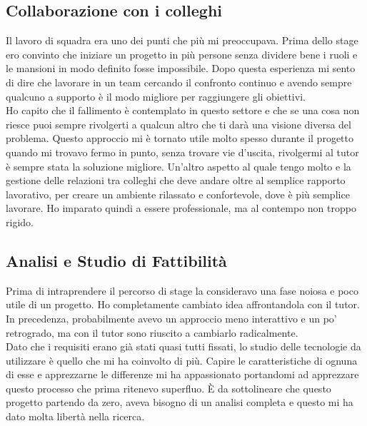 \subsection{Collaborazione con i colleghi}
Il lavoro di squadra era uno dei punti che più mi preoccupava. Prima dello stage ero convinto che iniziare un progetto in più persone senza
dividere bene i ruoli e le mansioni in modo definito fosse impossibile. Dopo questa esperienza mi sento di dire che lavorare in un team
cercando il confronto continuo e avendo sempre qualcuno a supporto è il modo migliore per raggiungere gli obiettivi. \\ 
\noindent Ho capito che il fallimento è contemplato in questo settore e che se una cosa non riesce puoi sempre rivolgerti a qualcun altro
che ti darà una visione diversa del problema. Questo approccio mi è tornato utile molto spesso durante il progetto quando mi trovavo fermo
in punto, senza trovare vie d'uscita, rivolgermi al tutor è sempre stata la soluzione migliore.
\noindent Un'altro aspetto al quale tengo molto e la gestione delle relazioni tra colleghi che deve andare oltre al semplice rapporto
lavorativo, per creare un ambiente rilassato e confortevole, dove è più semplice lavorare. Ho imparato quindi a essere professionale, ma al
contempo non troppo rigido.

\subsection{Analisi e Studio di Fattibilità}
Prima di intraprendere il percorso di stage la consideravo una fase noiosa e poco utile di un progetto. Ho completamente cambiato idea
affrontandola con il tutor. In precedenza, probabilmente avevo un approccio meno interattivo e un po' retrogrado, ma con il tutor sono
riuscito a cambiarlo radicalmente. \\ 
\noindent Dato che i requisiti erano già stati quasi tutti fissati, lo studio delle tecnologie da utilizzare è quello che mi ha coinvolto di
più. Capire le caratteristiche di ognuna di esse e apprezzarne le differenze mi ha appassionato portandomi ad apprezzare questo processo
che prima ritenevo superfluo. È da sottolineare che questo progetto partendo da zero, aveva bisogno di un analisi completa e questo mi ha
dato molta libertà nella ricerca. 

